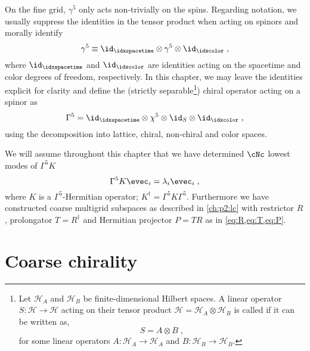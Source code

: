 On the fine grid, $\gamma^5$ only acts non-trivially on the spins.
Regarding notation, we usually suppress the identities in the tensor product when acting on spinors and morally identify
\begin{equation}
\gamma^5 \equiv \id_{\idxspacetime} \otimes \gamma^5 \otimes \id_{\idxcolor} \;,
\end{equation}
where $\id_{\idxspacetime}$ and $\id_{\idxcolor}$ are identities acting on the spacetime and color degrees of freedom, respectively.
In this chapter, we may leave the identities explicit for clarity and define the (strictly separable\footnote{Let $\mathcal{H}_A$ and $\mathcal{H}_B$ be finite-dimensional Hilbert spaces. A linear operator $S \colon \mathcal{H} \rightarrow \mathcal{H}$ acting on their tensor product $\mathcal{H} = \mathcal{H}_A \otimes \mathcal{H}_B$ is called  if it can be written as,
\begin{equation}
S = A \otimes B \;,
\end{equation}
for some linear operators $A \colon \mathcal{H}_A \rightarrow \mathcal{H}_A$ and $B \colon \mathcal{H}_B \rightarrow \mathcal{H}_B$.
}) chiral operator acting on a spinor as
\begin{equation}
\Gamma^5 = \id_{\idxspacetime} \otimes \chi^5 \otimes \id_S \otimes \id_{\idxcolor} \;,
\end{equation}
using the decomposition into lattice, chiral, non-chiral and color spaces.

We will assume throughout this chapter that we have determined $\cNc$ lowest modes of $\Gamma^{5} K$
\begin{equation} \label{eq:fine:low:modes}
\Gamma^5 K \evec_i = \lambda_i \evec_i \;,
\end{equation}
where $K$ is a $\Gamma^{5}$-Hermitian operator; $K^{\dagger} = \Gamma^{5} K \Gamma^{5}$.
Furthermore we have constructed coarse multigrid subspaces as described in \cref{ch:p2:lc} with restrictor $R$, prolongator $T=R^{\dagger}$ and Hermitian projector $P = TR$ as in \cref{eq:R,eq:T,eq:P}.


\section{Coarse chirality}
\label{sec:chirality:coarse}

